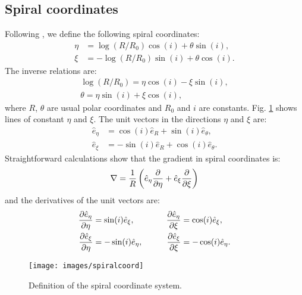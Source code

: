 \documentclass[useAMS,usenatbib]{mn2e}
\begin{document}
\subsection{Spiral coordinates}
\label{sec:spiral_coord}
%
Following \cite{Roberts1969}, we define the following spiral coordinates:
%
\begin{align}
 \eta & = \log\left(R/R_0\right) \cos(i)+\theta\sin(i), \\
 \xi   & = -\log\left(R/R_0\right) \sin(i)+\theta\cos(i).
\end{align}
%
The inverse relations are:
%
\begin{align}
 \log\left(R/R_0\right) = \eta \cos(i) - \xi \sin(i), \\
 \theta = \eta \sin(i)+ \xi \cos(i),
\end{align}
%
where $R$, $\theta$ are usual polar coordinates and $R_0$ and $i$ are constants. Fig. \ref{fig:spiralcoord} shows lines of constant $\eta$ and $\xi$. The unit vectors in the directions $\eta$ and $\xi$ are:
%
\begin{align}
\hat{e}_{\eta} & = \cos(i) \hat{e}_{R} + \sin(i) \hat{e}_{\theta}, \\ 
\hat{e}_{\xi}   & = - \sin(i) \hat{e}_{R} + \cos(i) \hat{e}_{\theta}.
\end{align}
%
Straightforward calculations show that the gradient in spiral coordinates is:
\begin{equation}
{\nabla}  =  \frac{1}{R}\left( \hat{e}_{\eta} \frac{\partial }{\partial {\eta}} + \hat{e}_{\xi} \frac{\partial }{\partial {\xi}} \right)
\end{equation}
and the derivatives of the unit vectors are:
%
\begin{align}
\frac{\partial \hat{e}_{\eta}}{\partial {\eta}} & = \sin(i) \hat{e}_{\xi}, \qquad  & \frac{\partial \hat{e}_{\eta}}{\partial {\xi}} &= \cos(i) \hat{e}_{\xi}, \\
\frac{\partial \hat{e}_{\xi}}{\partial {\eta}}   & = -\sin(i) \hat{e}_{\eta}, \qquad & \frac{\partial \hat{e}_{\xi}}{\partial {\xi}} &= - \cos(i) \hat{e}_{\eta} .
\end{align}

\begin{figure}
\texttt{[image: images/spiralcoord]}
 \caption{Definition of the spiral coordinate system.}
\label{fig:spiralcoord} 
\end{figure}
\end{document}
